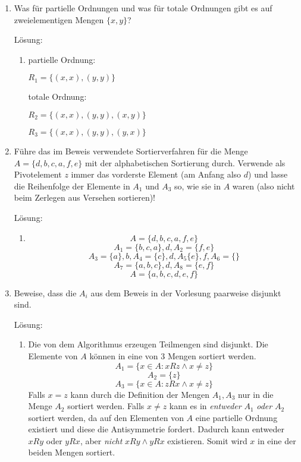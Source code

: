 \documentclass[main.tex]{subfiles}
\begin{document}
\begin{enumerate}
	\item Was für partielle Ordnungen und was für totale Ordnungen gibt es
	      auf zweielementigen Mengen \( \{x, y\} \)?

	      Lösung:
	      \begin{enumerate}
		      \item partielle Ordnung:

		            \( R_1 = \{ (x,x), (y,y) \}  \)

		            totale Ordnung:

		            \( R_2 = \{ (x, x), (y, y), (x, y) \}  \)

		            \( R_3 = \{ (x, x), (y, y), (y, x) \}  \)
	      \end{enumerate}
	\item Führe das im Beweis verwendete Sortierverfahren für die Menge \( A = \{ d, b, c, a, f, e \} \)
	      mit der alphabetischen Sortierung durch. Verwende als Pivotelement \( z \) immer
	      das vorderste Element (am Anfang also \( d \)) und lasse die Reihenfolge der
	      Elemente in \( A_1 \) und \( A_3 \) so, wie sie in \( A \) waren (also nicht beim Zerlegen aus
	      Versehen sortieren)!

	      Lösung:
	      \begin{enumerate}
		      \item \[ A = \{ d, b, c, a, f, e \} \]
		            \[ A_1 = \{b, c, a \}, d, A_2 = \{ f,e \} \]
		            \[ A_3 = \{ a \}, b,  A_4 = \{ c \}, d, A_5\{ e \}, f, A_6 = \{\} \]
		            \[ A_7 = \{a, b, c\}, d, A_8 = \{e,f\} \]
		            \[ A = \{a, b, c, d, e, f\}  \]
	      \end{enumerate}
	\item Beweise, dass die \( A_i \) aus dem Beweis in der Vorlesung paarweise disjunkt sind.

	      Lösung:
	      \begin{enumerate}
		      \item Die von dem Algorithmus erzeugen Teilmengen sind disjunkt.
		            Die Elemente von \( A \) können in eine von \( 3 \) Mengen sortiert werden.
		            \[ A_1 = \{ x \in A: xRz \land x \neq z \} \]
		            \[ A_2 = \{ z \} \]
		            \[ A_3 = \{ x \in A: zRx \land x \neq z \} \]
		            Falls \( x = z \) kann durch die Definition der Mengen \( A_1, A_3 \) nur in
		            die Menge \( A_2  \) sortiert werden.
		            Falls \( x \neq z \) kann es in \textit{entweder} \( A_1 \) \textit{oder} \( A_2 \)
		            sortiert werden, da auf den Elementen von \( A \) eine partielle Ordnung existiert und
		            diese die Antisymmetrie fordert. Dadurch kann entweder \( xRy \) oder \( yRx \), aber \textit{nicht}
		            \( xRy \land yRx \) existieren. Somit wird \( x \) in eine der beiden Mengen sortiert.


\end{enumerate}
\end{enumerate}
\end{document}
